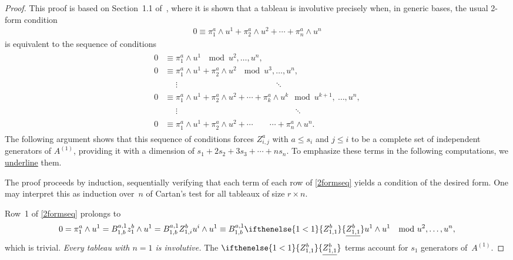 \documentclass[pdftex]{sigma}
\numberwithin{equation}{section}
\newcommand{\Z}[3]{\ifthenelse{#1<#2}{\ensuremath{Z^{#3}_{#1,#2}}}{\ensuremath{\underline{Z^{#3}_{#1,#2}}}}}
\begin{document}
\begin{proof}
This proof is based on Section~1.1 of~\cite{Yang1987}, where it is shown that a
tableau is involutive precisely when, in generic bases, the usual 2-form condition
\begin{gather*}
0 \equiv \pi^a_1 \wedge u^1 + \pi^a_2 \wedge u^2 +
\cdots + \pi^a_n\wedge u^n
\label{2form}
\end{gather*}
is equivalent to the sequence of conditions
\begin{gather}
\begin{split}
0 &\equiv \pi^a_1 \wedge u^1 \ \mod  u^2, \ldots, u^n, \\
0 &\equiv \pi^a_1 \wedge u^1 + \pi^a_2 \wedge u^2 \ \mod  u^3, \ldots, u^n, \\
  &\phantom{=}\vdots \phantom{\pi^a_1 \wedge u^1 + \pi^a_2 \wedge u^2 + \pi^a_3 \wedge u^3}\ddots \\
0 &\equiv \pi^a_1 \wedge u^1 + \pi^a_2 \wedge u^2 + \cdots + \pi^a_k
\wedge u^k  \mod  u^{k+1},\ \ldots, u^n, \\
  &\phantom{=}\vdots \phantom{\pi^a_1 \wedge u^1 + \pi^a_2 \wedge u^2 + \cdots + \pi^a_i \wedge u^i,}\ddots
      \\
0 &\equiv  \pi^a_1 \wedge u^1 + \pi^a_2 \wedge u^2 +
 \cdots\qquad\cdots + \pi^a_n\wedge u^n.
\end{split}
\label{2formseq}
\end{gather}
The following argument shows that this sequence of conditions forces $Z^a_{i,j}$ with $a
\leq s_i$ and $j \leq i$ to be a complete set of independent generators of
$A^{(1)}$, providing it with a dimension of $s_1 + 2s_2 + 3s_3 + \cdots + n
s_n$.   To emphasize these terms in the following computations, we
\underline{underline} them.

The proof proceeds by induction, sequentially verifying that each term of
each row of \eqref{2formseq} yields a condition of the desired form.  One may
interpret this as induction over~$n$ of Cartan's test for all tableaux
of size $r \times n$.

Row~1 of \eqref{2formseq} prolongs to
\begin{gather*}
0 = \pi^a_1 \wedge u^1
  = B^{a,1}_{1,b} z^b_1 \wedge u^1
  = B^{a,1}_{1,b} Z^b_{1,i} u^i \wedge u^1
  \equiv
     B^{a,1}_{1,b} \Z{1}{1}{b} u^1 \wedge u^1 \  \mod u^2, \ldots, u^n,
\end{gather*}
which is trivial.  \emph{Every tableau with $n=1$ is
involutive.}   The $\Z{1}{1}{b}$ terms account for $s_1$ generators
of~$A^{(1)}$.


\end{proof}
\end{document}
